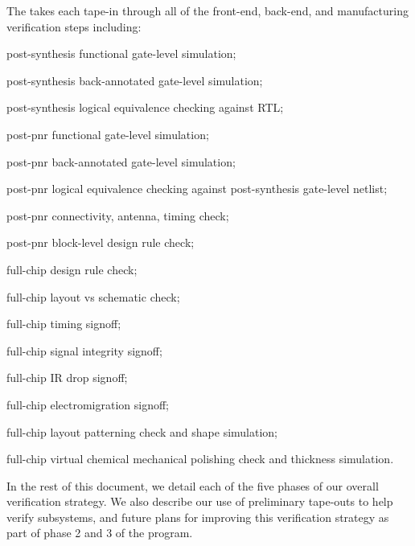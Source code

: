 \begin{cbxlist}{1.5em}{1em}{1em}
\begin{cbxlist}[--]{1.5em}{0em}{0em}
    \end{cbxlist}

 \item The  takes each
    tape-in through all of the front-end, back-end, and manufacturing
    verification steps including:

    \smallskip
    \begin{cbxlist}[--]{1.5em}{0em}{0em}
      \raggedright

      \item post-synthesis functional gate-level simulation;
      \item post-synthesis back-annotated gate-level simulation;
      \item post-synthesis logical equivalence checking against RTL;
      \item post-pnr functional gate-level simulation;
      \item post-pnr back-annotated gate-level simulation;
      \item post-pnr logical equivalence checking against post-synthesis
         gate-level netlist;
      \item post-pnr connectivity, antenna, timing check;
      \item post-pnr block-level design rule check;
      \item full-chip design rule check;
      \item full-chip layout vs schematic check;
      \item full-chip timing signoff;
      \item full-chip signal integrity signoff;
      \item full-chip IR drop signoff;
      \item full-chip electromigration signoff;
      \item full-chip layout patterning check and shape simulation;
      \item full-chip virtual chemical mechanical polishing check and
         thickness simulation.

    \end{cbxlist}

\end{cbxlist}

\medskip\noindent
In the rest of this document, we detail each of the
five phases of our overall verification strategy. We also describe our
use of preliminary tape-outs to help verify subsystems, and future plans
for improving this verification strategy as part of phase 2 and 3 of the
program.
